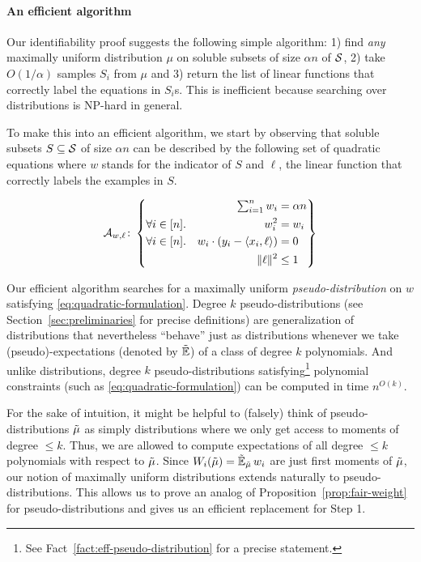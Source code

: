 \paragraph{An efficient algorithm}
Our identifiability proof suggests the following simple algorithm: 1) find \emph{any} maximally uniform distribution $\mu$ on soluble subsets of size $\alpha n$ of $\mathcal S$, 2) take $O(1/\alpha)$ samples $S_i$ from $\mu$ and 3) return the list of linear functions that correctly label the equations in $S_i$s. This is inefficient because searching over distributions is NP-hard in general. 

To make this into an efficient algorithm, we start by observing that soluble subsets $S \subseteq \mathcal S$ of size $\alpha n$ can be described by the following set of quadratic equations where $w$ stands for the indicator of $S$ and $\ell$, the linear function that correctly labels the examples in $S$. 

\begin{equation} \label{eq:quadratic-formulation}
  \cA_{w,\ell}\colon
  \left \{
    \begin{aligned}
      &&
      \textstyle\sum_{i=1}^n w_i
      &= \alpha n\\
      &\forall i\in [n].
      & w_i^2
      & =w_i \\
      &\forall i\in [n].
      & w_i \cdot (y_i - \iprod{x_i,\ell})
      & = 0\\
      &
      &\|\ell\|^2
      & \leq 1\\
    \end{aligned}
  \right \}
\end{equation} 

Our efficient algorithm searches for a maximally uniform \emph{pseudo-distribution} on $w$ satisfying \eqref{eq:quadratic-formulation}. Degree $k$ pseudo-distributions (see Section~\ref{sec:preliminaries} for precise definitions) are generalization of distributions that nevertheless ``behave'' just as distributions whenever we take (pseudo)-expectations (denoted by $\operatorname{\tilde{\mathbb{E}}}$) of a class of degree $k$ polynomials. And unlike distributions, degree $k$ pseudo-distributions satisfying\footnote{See Fact~\ref{fact:eff-pseudo-distribution} for a precise statement.} polynomial constraints (such as \eqref{eq:quadratic-formulation}) can be computed in time $n^{O(k)}$. 

For the sake of intuition, it might be helpful to (falsely) think of pseudo-distributions $\tilde{\mu}$ as simply distributions where we only get access to moments of degree $\leq k$. Thus, we are allowed to compute expectations of all degree $\leq k$ polynomials with respect to $\tilde{\mu}$. Since $W_i(\tilde{\mu}) = \operatorname{\tilde{\mathbb{E}}}_{\tilde{\mu}} w_i$ are just first moments of $\tilde{\mu}$, our notion of maximally uniform distributions extends naturally to pseudo-distributions. This allows us to prove an analog of Proposition~\ref{prop:fair-weight} for pseudo-distributions and gives us an efficient replacement for Step 1.

